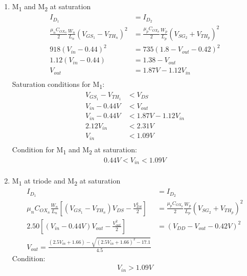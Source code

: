 \documentclass{article}
\begin{document}
\begin{enumerate}
\begin{enumerate}
\item M\textsubscript{1} and M\textsubscript{2} at saturation
\begin{equation*}
\begin{aligned}
I_{D_{1}} &= I_{D_{2}} \\
\frac{\mu_{n}C_{OX_{n}}}{2}\frac{W_{n}}{L_{n}}(V_{GS_{1}} - V_{TH_{n}})^{2} &=
\frac{\mu_{p}C_{OX_{p}}}{2}\frac{W_{p}}{L_{p}}(V_{SG_{2}} + V_{TH_{p}})^{2} \\
918(V_{in} - 0.44)^{2} &= 735(1.8 - V_{out} - 0.42)^{2} \\
1.12(V_{in} - 0.44) &= 1.38 - V_{out} \\
V_{out} &= 1.87V - 1.12V_{in} \\
\end{aligned}
\end{equation*}
Saturation conditions for M\textsubscript{1}:
\begin{equation*}
\begin{aligned}
V_{GS_{1}} - V_{TH_{1}} &< V_{DS} \\
V_{in} - 0.44V &< V_{out} \\
V_{in} - 0.44V &< 1.87V - 1.12V_{in} \\
2.12V_{in} &< 2.31V \\
V_{in} &< 1.09V \\
\end{aligned}
\end{equation*}
Condition for M\textsubscript{1} and M\textsubscript{2} at saturation:
\begin{equation*}
\begin{aligned}
0.44V < V_{in} < 1.09V \\
\end{aligned}
\end{equation*}

\item M\textsubscript{1} at triode and M\textsubscript{2} at saturation
\begin{equation*}
\begin{aligned}
I_{D_{1}} &= I_{D_{2}} \\
\mu_{n}C_{OX_{n}}\frac{W_{n}}{L_{n}}[(V_{GS_{1}} - V_{TH_{n}})V_{DS} - \frac{V_{DS}^2}{2}] &=
\frac{\mu_{p}C_{OX_{p}}}{2}\frac{W_{p}}{L_{p}}(V_{SG_{2}} + V_{TH_{p}})^{2} \\
2.50[(V_{in} - 0.44V)V_{out} - \frac{V_{out}^2}{2}] &= (V_{DD} - V_{out} - 0.42V)^{2} \\
V_{out} = \frac{(2.5V_{in} + 1.66) - \sqrt{(2.5V_{in} + 1.66)^{2} - 17.1}}{4.5}
\end{aligned}
\end{equation*}
Condition:
\begin{equation*}
\begin{aligned}
V_{in} > 1.09V \\
\end{aligned}
\end{equation*}
\end{enumerate}


\end{enumerate}
\end{document}
